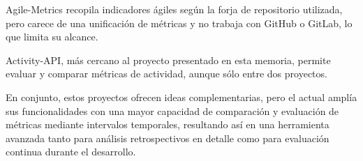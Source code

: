 Agile-Metrics recopila indicadores ágiles según la forja de repositorio utilizada, pero carece de una unificación de métricas y no trabaja con GitHub o GitLab, lo que limita su alcance. 

Activity-API, más cercano al proyecto presentado en esta memoria, permite evaluar y comparar métricas de actividad, aunque sólo entre dos proyectos. 

En conjunto, estos proyectos ofrecen ideas complementarias, pero el actual amplía sus funcionalidades con una mayor capacidad de comparación y evaluación de métricas mediante intervalos temporales, resultando así en una herramienta avanzada tanto para análisis retrospectivos en detalle como para evaluación continua durante el desarrollo.